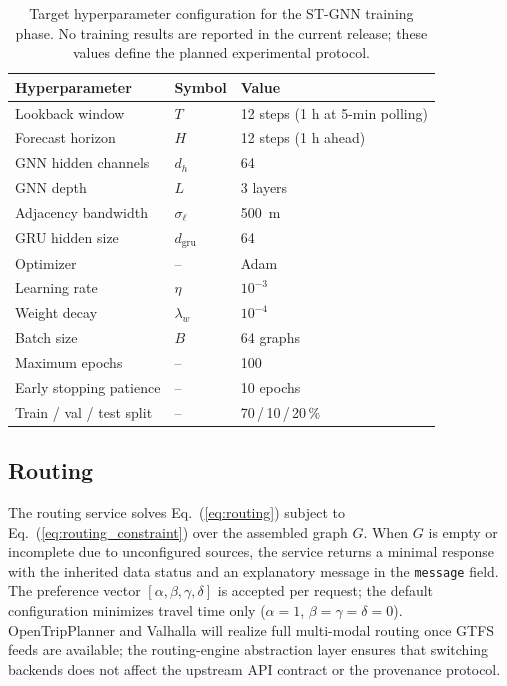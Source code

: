 \begin{table}[t]
\caption{Target hyperparameter configuration for the ST-GNN training phase.
         No training results are reported in the current release; these
         values define the planned experimental protocol.}
\label{tab:hyperparams}
\centering
\renewcommand{\arraystretch}{1.20}
\begin{tabular}{@{}lll@{}}
\toprule
\textbf{Hyperparameter} & \textbf{Symbol} & \textbf{Value} \\
\midrule
Lookback window        & $T$           & 12 steps (1 h at 5-min polling) \\
Forecast horizon       & $H$           & 12 steps (1 h ahead) \\
GNN hidden channels    & $d_h$         & 64 \\
GNN depth              & $L$           & 3 layers \\
Adjacency bandwidth    & $\sigma_\ell$ & \SI{500}{m} \\
GRU hidden size        & $d_\mathrm{gru}$ & 64 \\
Optimizer              & --            & Adam \\
Learning rate          & $\eta$        & $10^{-3}$ \\
Weight decay           & $\lambda_w$   & $10^{-4}$ \\
Batch size             & $B$           & 64 graphs \\
Maximum epochs         & --            & 100 \\
Early stopping patience& --            & 10 epochs \\
Train / val / test split & --          & 70\,/\,10\,/\,20\,\% \\
\bottomrule
\end{tabular}
\end{table}

\subsection{Routing}

The routing service solves Eq.~(\ref{eq:routing}) subject to
Eq.~(\ref{eq:routing_constraint}) over the assembled graph $G$.
When $G$ is empty or incomplete due to unconfigured sources, the service
returns a minimal response with the inherited data status and an explanatory
message in the \texttt{message} field.
The preference vector $[\alpha, \beta, \gamma, \delta]$ is accepted per
request; the default configuration minimizes travel time only
($\alpha=1$, $\beta=\gamma=\delta=0$).
OpenTripPlanner and Valhalla will realize full multi-modal routing once
GTFS feeds are available; the routing-engine abstraction layer
ensures that switching backends does not affect the upstream API contract
or the provenance protocol.

